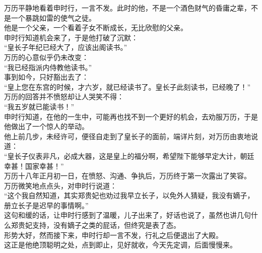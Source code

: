 \begin{multicols}{\theparacolNo}
万历平静地看着申时行，一言不发。此时的他，不是一个酒色财气的昏庸之辈，不是一个暴跳如雷的使气之徒。\\

他是一个父亲，一个看着子女不断成长，无比欣慰的父亲。\\

申时行知道机会来了，于是他打破了沉默：\\

“皇长子年纪已经大了，应该出阁读书。”\\

万历的心意似乎仍未改变：\\

“我已经指派内侍教他读书。”\\

事到如今，只好豁出去了：\\

“皇上您在东宫的时候，才六岁，就已经读书了。皇长子此刻读书，已经晚了！”\\

万历的回答并不愤怒却让人哭笑不得：\\

“我五岁就已能读书！”\\

申时行知道，在他的一生中，可能再也找不到一个更好的机会，去劝服万历，于是他做出了一个惊人的举动。\\

他上前几步，未经许可，便径自走到了皇长子的面前，端详片刻，对万历由衷地说道：\\

“皇长子仪表非凡，必成大器，这是皇上的福分啊，希望陛下能够早定大计，朝廷幸甚！国家幸甚！”\\

万历十八年正月初一日，在愤怒、沟通、争执后，万历终于第一次露出了笑容。\\

万历微笑地点点头，对申时行说道：\\

“这个我自然知道，其实郑贵妃也劝过我早立长子，以免外人猜疑，我没有嫡子，册立长子是迟早的事情啊。”\\

这句和缓的话，让申时行感到了温暖，儿子出来了，好话也说了，虽然也讲几句什么郑贵妃支持，没有嫡子之类的屁话，但终究是表了态。\\

形势大好，然而接下来，申时行却一言不发，行礼之后便退出了大殿。\\

这正是他绝顶聪明之处，点到即止，见好就收，今天先定调，后面慢慢来。\\


\end{multicols}
